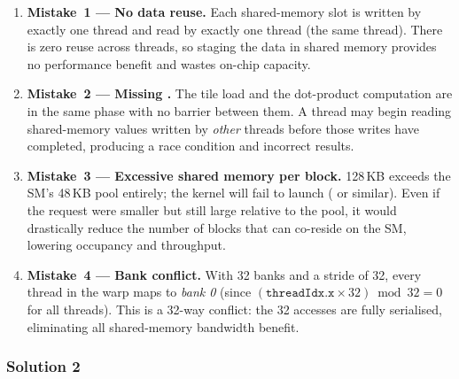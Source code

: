 \begin{enumerate}[label=(\alph*)]
  \item \textbf{Mistake~1 --- No data reuse.}  Each shared-memory slot is written
        by exactly one thread and read by exactly one thread (the same thread).
        There is zero reuse across threads, so staging the data in shared memory
        provides no performance benefit and wastes on-chip capacity.

  \item \textbf{Mistake~2 --- Missing .}  The tile
        load and the dot-product computation are in the same phase with no barrier
        between them.  A thread may begin reading shared-memory values written by
        \emph{other} threads before those writes have completed, producing a race
        condition and incorrect results.

  \item \textbf{Mistake~3 --- Excessive shared memory per block.}  128\,KB exceeds
        the SM's 48\,KB pool entirely; the kernel will fail to launch
        ( or similar).  Even if the request were
        smaller but still large relative to the pool, it would drastically reduce
        the number of blocks that can co-reside on the SM, lowering occupancy and
        throughput.

  \item \textbf{Mistake~4 --- Bank conflict.}  With 32 banks and a stride of 32,
        every thread in the warp maps to \emph{bank 0} (since
        $(\texttt{threadIdx.x} \times 32) \bmod 32 = 0$ for all threads).  This
        is a 32-way conflict: the 32 accesses are fully serialised, eliminating
        all shared-memory bandwidth benefit.
\end{enumerate}

\subsubsection{Solution 2}

